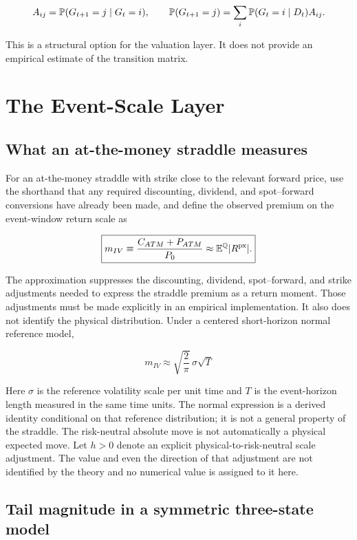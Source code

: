 \[
A_{ij}=\mathbb{P}(G_{t+1}=j\mid G_t=i),
\qquad
\mathbb{P}(G_{t+1}=j)=\sum_i\mathbb{P}(G_t=i\mid D_t)A_{ij}.
\]

This is a structural option for the valuation layer. It does not provide an
empirical estimate of the transition matrix.

\section{The Event-Scale Layer}
\label{sec:move}

\subsection{What an at-the-money straddle measures}

For an at-the-money straddle with strike close to the relevant forward price,
use the shorthand that any required discounting, dividend, and spot--forward
conversions have already been made, and define the observed premium on the
event-window return scale as

\[
\boxed{
m_{IV}\equiv\frac{C_{ATM}+P_{ATM}}{P_0}
\approx\mathbb{E}^{\mathbb Q}|R^{\mathrm{px}}|.
}
\]

The approximation suppresses the discounting, dividend, spot--forward, and
strike adjustments needed to express the straddle premium as a return moment.
Those adjustments must be made explicitly in an empirical implementation. It
also does not identify the physical distribution. Under a centered short-horizon
normal reference model,

\[
m_{IV}\approx\sqrt{\frac{2}{\pi}}\,\sigma\sqrt{T}
\]

\newpage

Here $\sigma$ is the reference volatility scale per unit time and $T$ is the
event-horizon length measured in the same time units. The normal expression is a
derived identity conditional on that reference distribution; it is not a general
property of the straddle. The risk-neutral
absolute move is not automatically a physical expected move. Let $h>0$ denote
an explicit physical-to-risk-neutral scale adjustment. The value and even the
direction of that adjustment are not identified by the theory and no numerical
value is assigned to it here.

\subsection{Tail magnitude in a symmetric three-state model}

